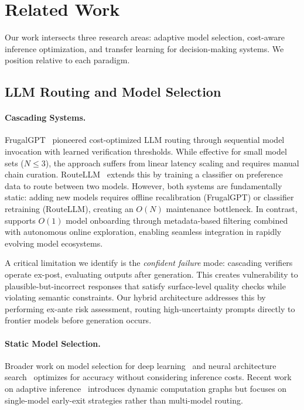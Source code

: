 
\section{Related Work}
\label{sec:related}

Our work intersects three research areas: adaptive model selection, cost-aware inference optimization, and transfer learning for decision-making systems. We position \ours{} relative to each paradigm.

\subsection{LLM Routing and Model Selection}

\paragraph{Cascading Systems.} FrugalGPT~\cite{chen2023frugalgpt} pioneered cost-optimized LLM routing through sequential model invocation with learned verification thresholds. While effective for small model sets ($N \leq 3$), the approach suffers from linear latency scaling and requires manual chain curation. RouteLLM~\cite{ong2024routellm} extends this by training a classifier on preference data to route between two models. However, both systems are fundamentally static: adding new models requires offline recalibration (FrugalGPT) or classifier retraining (RouteLLM), creating an $O(N)$ maintenance bottleneck. In contrast, \ours{} supports $O(1)$ model onboarding through metadata-based filtering combined with autonomous online exploration, enabling seamless integration in rapidly evolving model ecosystems.

A critical limitation we identify is the \emph{confident failure} mode: cascading verifiers operate ex-post, evaluating outputs after generation. This creates vulnerability to plausible-but-incorrect responses that satisfy surface-level quality checks while violating semantic constraints. Our hybrid architecture addresses this by performing ex-ante risk assessment, routing high-uncertainty prompts directly to frontier models before generation occurs.

\paragraph{Static Model Selection.} Broader work on model selection for deep learning~\cite{hospedales2021meta} and neural architecture search~\cite{elsken2019neural} optimizes for accuracy without considering inference costs. Recent work on adaptive inference~\cite{han2021dynamic} introduces dynamic computation graphs but focuses on single-model early-exit strategies rather than multi-model routing.


